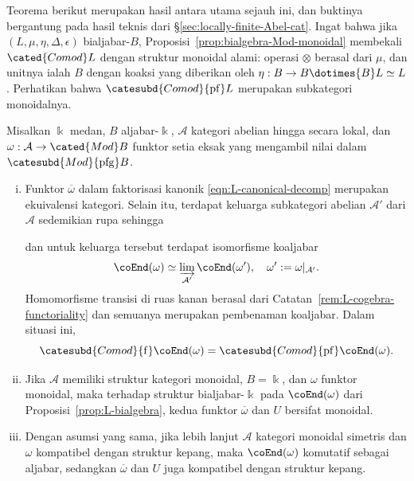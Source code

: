 Teorema berikut merupakan hasil antara utama sejauh ini, dan buktinya
bergantung pada hasil teknis dari \S\ref{sec:locally-finite-Abel-cat}.
Ingat bahwa jika $(L,\mu,\eta,\Delta,\epsilon)$ bialjabar-$B$,
Proposisi~\ref{prop:bialgebra-Mod-monoidal} membekali
$\cated{Comod}L$ dengan struktur monoidal alami: operasi $\otimes$ berasal
dari $\mu$, dan unitnya ialah $B$ dengan koaksi yang diberikan oleh
$\eta:B\to B\dotimes{B}L\simeq L$. Perhatikan bahwa
$\catesubd{Comod}{\mathrm{pf}}L$ merupakan subkategori monoidalnya.

\begin{theorem}\label{prop:Tannaka-aux1}
	Misalkan $\Bbbk$ medan, $B$ aljabar-$\Bbbk$, $\mathcal{A}$ kategori
	abelian hingga secara lokal, dan
	$\omega:\mathcal{A}\to\cated{Mod}B$ funktor setia eksak yang mengambil
	nilai dalam $\catesubd{Mod}{\mathrm{pfg}}B$.
	\begin{enumerate}[(i)]
		\item Funktor $\overline\omega$ dalam faktorisasi kanonik
		\eqref{eqn:L-canonical-decomp} merupakan ekuivalensi kategori. Selain
		itu, terdapat keluarga subkategori abelian $\mathcal{A}'$ dari
		$\mathcal{A}$ sedemikian rupa sehingga
		dan untuk keluarga tersebut terdapat isomorfisme koaljabar
		\[ \coEnd(\omega) \simeq \varinjlim_{\mathcal{A}'} \coEnd(\omega'), \quad \omega' := \omega|_{\mathcal{A}'}. \]
		Homomorfisme transisi di ruas kanan berasal dari
		Catatan~\ref{rem:L-cogebra-functoriality} dan semuanya merupakan pembenaman
		koaljabar. Dalam situasi ini,
		\[ \catesubd{Comod}{\mathrm f}\coEnd(\omega)=
		\catesubd{Comod}{\mathrm{pf}}\coEnd(\omega). \]

		\item Jika $\mathcal{A}$ memiliki struktur kategori monoidal,
		$B=\Bbbk$, dan $\omega$ funktor monoidal, maka terhadap struktur
		bialjabar-$\Bbbk$ pada $\coEnd(\omega)$ dari
		Proposisi~\ref{prop:L-bialgebra}, kedua funktor
		$\overline\omega$ dan $U$ bersifat monoidal.
		\item Dengan asumsi yang sama, jika lebih lanjut $\mathcal{A}$ kategori
		monoidal simetris dan $\omega$ kompatibel dengan struktur kepang, maka
		$\coEnd(\omega)$ komutatif sebagai aljabar, sedangkan
		$\overline\omega$ dan $U$ juga kompatibel dengan struktur kepang.
	\end{enumerate}
\end{theorem}
